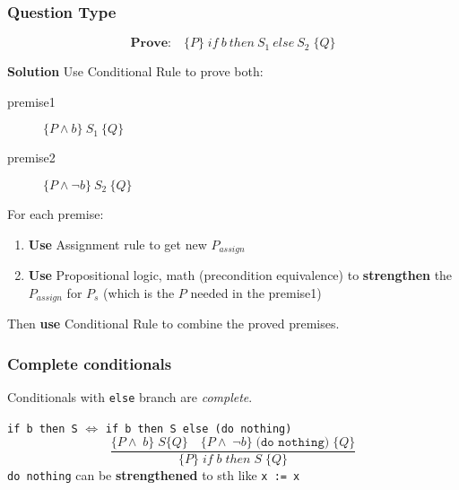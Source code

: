 \subsubsection*{Question Type}
{
  \setlength{\abovedisplayskip}{0pt}
  \setlength{\belowdisplayskip}{3pt}
  \setlength{\abovedisplayshortskip}{0pt}
  \setlength{\belowdisplayshortskip}{3pt}

\[\textbf{Prove:}\quad \{P\}\;if\:b\:then\:S_{1}\:else\:S_{2}\;\{Q\}\]
}
\textbf{Solution} Use Conditional Rule to prove both:
\begin{description}
\item [premise1] \(\{P \land b\}\:S_{1}\:\{Q\}\)
\item [premise2] \(\{P \land \neg b\}\:S_{2}\:\{Q\}\)
\end{description}
For each premise:
\begin{enumerate}
\item\label{step1} \textbf{Use} Assignment rule to get new \(P_{assign}\)
\item\label{step2} \textbf{Use} Propositional logic, math (precondition equivalence) to \textbf{strengthen} the \(P_{assign}\) for \(P_{s}\) (which is the \(P\) needed in the premise1)
\end{enumerate}
Then \textbf{use} Conditional Rule to combine the proved premises.

\subsubsection*{Complete conditionals}
Conditionals with \texttt{else} branch are \emph{complete}.

\texttt{if b then S} $\Longleftrightarrow$ \texttt{if b then S else (do nothing)}
\begin{displaymath}
  \frac{\{P \land\; b\}\;S\{Q\} \quad \{P \land \;\neg b\}\;\texttt{(do nothing)}\;\{Q\}}{\{P\}\;if\;b\;then\;S\;\{Q\}}
\end{displaymath}
\texttt{do nothing} can be \textbf{strengthened} to sth like \verb|x := x|
